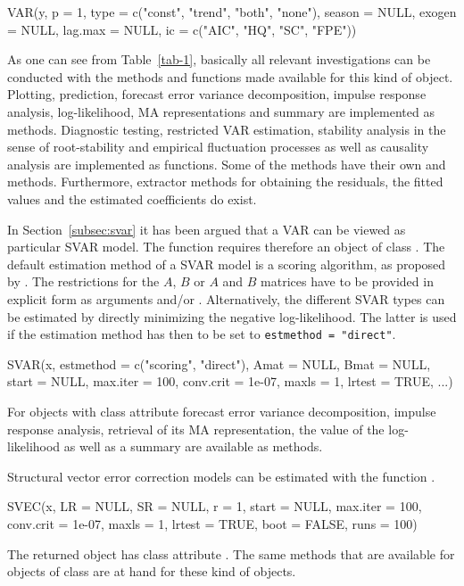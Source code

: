 \documentclass[nojss]{jss}
\begin{document}
\begin{CodeInput}
VAR(y, p = 1, type = c("const", "trend", "both", "none"), 
  season = NULL, exogen = NULL, lag.max = NULL,
  ic = c("AIC", "HQ", "SC", "FPE"))  
\end{CodeInput} 
As one can see from Table~\ref{tab-1}, basically all relevant
investigations can be conducted with the methods and functions made
available for this kind of object. Plotting, prediction, forecast
error variance decomposition, impulse response analysis,
log-likelihood, MA representations and summary are implemented as
methods. Diagnostic testing, restricted VAR estimation, stability
analysis in the sense of root-stability and empirical fluctuation
processes as well as causality analysis are implemented as
functions. Some of the methods have their own  and
 methods. Furthermore, extractor methods for obtaining the
residuals, the fitted values and the estimated coefficients do exist.

In Section~\ref{subsec:svar} it has been argued that a VAR can be
viewed as particular SVAR model. The function  requires therefore
an object of class . The default estimation method of a
SVAR model is a scoring algorithm, as proposed by \citet{AMI1997}. The
restrictions for the $A$, $B$ or $A$ and $B$ matrices have to be
provided in explicit form as arguments  and/or
. Alternatively, the different SVAR types can be estimated
by directly minimizing the negative log-likelihood. The latter is used
if the estimation method has then to be set to \verb/estmethod = "direct"/.   
\begin{CodeInput}
SVAR(x, estmethod = c("scoring", "direct"), Amat = NULL, Bmat = NULL,
  start = NULL, max.iter = 100, conv.crit = 1e-07, maxls = 1,
  lrtest = TRUE, ...)
\end{CodeInput}  
For objects with class attribute  forecast error
variance decomposition, impulse response analysis, retrieval of its MA
representation,  the value of the log-likelihood as well as a summary
are available as methods.

Structural vector error correction models can be estimated with the
function .
\begin{CodeInput}
SVEC(x, LR = NULL, SR = NULL, r = 1, start = NULL, max.iter = 100, 
  conv.crit = 1e-07, maxls = 1, lrtest = TRUE, boot = FALSE, runs = 100)
\end{CodeInput}
The returned object has class attribute . The same
methods that are available for objects of class  are at
hand for these kind of objects.
\end{document}
